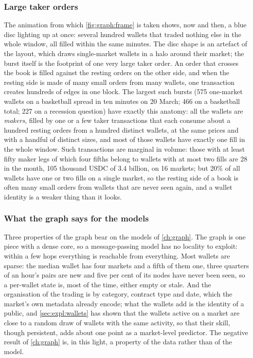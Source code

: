 \subsubsection{Large taker orders}
\label{sec:expl:graph:bursts}

The animation from which \cref{fig:graph:frame} is taken shows, now and then, a blue disc
lighting up at once: several hundred wallets that traded nothing else in the whole window,
all filled within the same minutes.  The disc shape is an artefact of the layout, which
draws single-market wallets in a halo around their market; the burst itself is the
footprint of one very large taker order.  An order that crosses the book is filled against
the resting orders on the other side, and when the resting side is made of many small
orders from many wallets, one transaction creates hundreds of edges in one block.  The
largest such bursts (575 one-market wallets on a basketball spread in ten minutes on
20 March; 466 on a basketball total; 227 on a recession question) have exactly this
anatomy: all the wallets are \emph{makers}, filled by one or a few taker transactions that
each consume about a hundred resting orders from a hundred distinct wallets, at the same
prices and with a handful of distinct sizes, and most of those wallets have exactly one
fill in the whole window.  Such transactions are marginal in volume: those with at least
fifty maker legs of which four fifths belong to wallets with at most two fills are 28 in
the month, 105 thousand USDC of 3.4 billion, on 16 markets; but 20\% of all wallets have
one or two fills on a single market, so the resting side of a book is often many small
orders from wallets that are never seen again, and a wallet identity is a weaker thing
than it looks.

\subsubsection{What the graph says for the models}
\label{sec:expl:graph:models}

Three properties of the graph bear on the models of \cref{ch:graph}.  The graph is one
piece with a dense core, so a message-passing model has no locality to exploit: within a
few hops everything is reachable from everything.  Most wallets are sparse: the median
wallet has four markets and a fifth of them one, three quarters of an hour's pairs are new
and five per cent of its nodes have never been seen, so a per-wallet state is, most of the
time, either empty or stale.  And the organisation of the trading is by category, contract
type and date, which the market's own metadata already encode; what the wallets add is the
identity of a public, and \cref{sec:expl:wallets} has shown that the wallets active on a
market are close to a random draw of wallets with the same activity, so that their skill,
though persistent, adds about one point as a market-level predictor.  The negative
result of \cref{ch:graph} is, in this light, a property of the data rather than of the
model.
